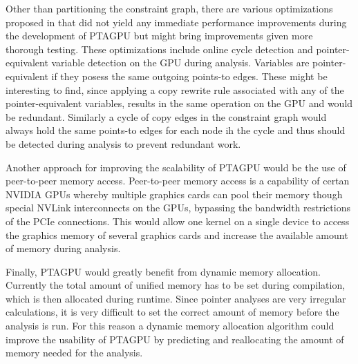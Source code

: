 Other than partitioning the constraint graph, there are various optimizations proposed in \cite{mendez2012gpu} that did not yield any immediate performance improvements during the development of PTAGPU but might bring improvements given more thorough testing.
These optimizations include online cycle detection and pointer-equivalent variable detection on the GPU during analysis.
Variables are pointer-equivalent if they posess the same outgoing points-to edges. These might be interesting to find, since applying a copy rewrite rule associated with any of the pointer-equivalent variables, results in the same operation on the GPU and would be redundant.
Similarly a cycle of copy edges in the constraint graph would always hold the same points-to edges for each node ih the cycle and thus should be detected during analysis to prevent redundant work.

Another approach for improving the scalability of PTAGPU would be the use of peer-to-peer memory access.
Peer-to-peer memory access is a capability of certan NVIDIA GPUs whereby multiple graphics cards can pool their memory though special NVLink interconnects on the GPUs, bypassing the bandwidth restrictions of the PCIe connections.
This would allow one kernel on a single device to access the graphics memory of several graphics cards and increase the available amount of memory during analysis.

Finally, PTAGPU would greatly benefit from dynamic memory allocation. Currently the total amount of unified memory has to be set during compilation, which is then allocated during runtime.
Since pointer analyses are very irregular calculations, it is very difficult to set the correct amount of memory before the analysis is run.
For this reason a dynamic memory allocation algorithm could improve the usability of PTAGPU by predicting and reallocating the amount of memory needed for the analysis.


